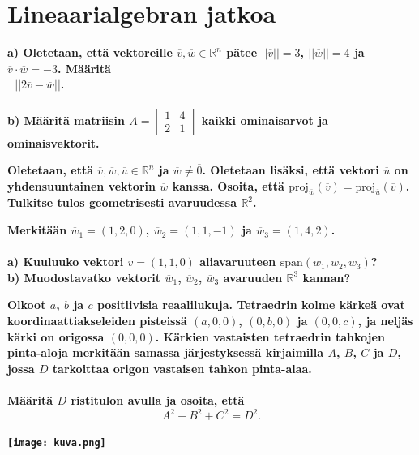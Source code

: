 \documentclass[12pt,finnish]{exam}
\begin{document}
 \section*{Lineaarialgebran jatkoa}
 
\vspace{5mm}
 
\begin{questions}
\bfseries
\question
\mdseries
\textbf{a)} Oletetaan, että vektoreille \(\overline{v}, \overline{w}\in \mathbb{R}^n\) pätee \(||\overline{v}||=3\), \(||\overline{w}||=4\) ja \(\overline{v}\cdot \overline{w}=-3\). Määritä\\ \(\text{    }||2\overline{v}-\overline{w}||\).\\
 \\
\textbf{b)} Määritä matriisin \(A=\begin{bmatrix} 1 & 4 \\ 2 & 1 \end{bmatrix}\) kaikki ominaisarvot ja ominaisvektorit.

\bfseries
\question
\mdseries
Oletetaan, että \(\overline{v}, \overline{w}, \overline{u}\in \mathbb{R}^n\) ja \(\overline{w}\neq \overline{0}\). Oletetaan lisäksi, että vektori \(\overline{u}\) on yhdensuuntainen vektorin \(\overline{w}\) kanssa. Osoita, että \(\text{proj}_{\overline{w}}(\overline{v})=\text{proj}_{\overline{u}}({\overline{v}})\). Tulkitse tulos geometrisesti avaruudessa \(\mathbb{R}^2\).


\bfseries
\question
\mdseries
Merkitään \(\overline{w}_1=(1, 2, 0)\), \(\overline{w}_2=(1, 1, -1)\) ja \(\overline{w}_3=(1, 4, 2)\).\\
 \\
\textbf{a)} Kuuluuko vektori \(\overline{v}=(1, 1, 0)\) aliavaruuteen \(\text{span}\left (\overline{w}_1, \overline{w}_2, \overline{w}_3\right )\)?\\
\textbf{b)} Muodostavatko vektorit \(\overline{w}_1\), \(\overline{w}_2\), \(\overline{w}_3\) avaruuden \(\mathbb{R}^3\) kannan?

\bfseries
\question
\mdseries
Olkoot \(a\), \(b\) ja \(c\) positiivisia reaalilukuja. Tetraedrin kolme kärkeä ovat koordinaattiakseleiden pisteissä \((a, 0, 0)\), \((0, b, 0)\) ja \((0, 0, c)\), ja neljäs kärki on origossa \((0, 0, 0)\). Kärkien vastaisten tetraedrin tahkojen pinta-aloja merkitään samassa järjestyksessä kirjaimilla \(A\), \(B\), \(C\) ja \(D\), jossa \(D\) tarkoittaa origon vastaisen tahkon pinta-alaa.\\
 \\
Määritä \(D\) ristitulon avulla ja osoita, että $$A^2+B^2+C^2=D^2.$$
 \\
\centering
\texttt{[image: kuva.png]}

\end{questions}
\thispagestyle{empty}
\end{document}
